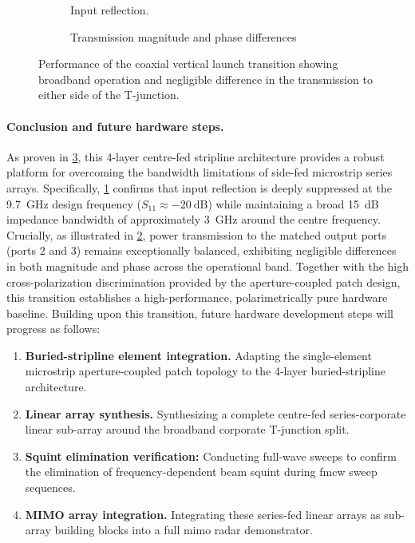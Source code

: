 \begin{figure}[!ht]
    \centering
    \begin{subfigure}{0.38\textwidth}
        \centering
        
        \caption{Input reflection.}
        \label{fig:vertical_coaxial_launcher_reflection}
    \end{subfigure}
    \hfill
    \begin{subfigure}{0.58\textwidth}
        \centering
        
        \caption{Transmission magnitude and phase differences}
        \label{fig:vertical_coaxial_launcher_transmission_differences}
    \end{subfigure}
    \caption{Performance of the coaxial vertical launch transition showing broadband operation and negligible difference in the transmission to either side of the T-junction.}
    \label{fig:vertical_coaxial_launcher_performance}
\end{figure}

\paragraph{Conclusion and future hardware steps.}
As proven in \cref{fig:vertical_coaxial_launcher_performance}, this 4-layer centre-fed stripline architecture provides a robust platform for overcoming the bandwidth limitations of side-fed microstrip series arrays.
Specifically, \cref{fig:vertical_coaxial_launcher_reflection} confirms that input reflection is deeply suppressed at the \qty{9.7}{\giga\hertz} design frequency ($S_{11} \approx \qty{-20}{\dB}$) while maintaining a broad \qty{15}{\dB} impedance bandwidth of approximately \qty{3}{\giga\hertz} around the centre frequency.
Crucially, as illustrated in \cref{fig:vertical_coaxial_launcher_transmission_differences}, power transmission to the matched output ports (ports 2 and 3) remains exceptionally balanced, exhibiting negligible differences in both magnitude and phase across the operational band.
Together with the high cross-polarization discrimination provided by the aperture-coupled patch design, this transition establishes a high-performance, polarimetrically pure hardware baseline.
Building upon this transition, future hardware development steps will progress as follows:
\begin{enumerate}
    \item \textbf{Buried-stripline element integration.} Adapting the single-element microstrip aperture-coupled patch topology to the 4-layer buried-stripline architecture.
    \item \textbf{Linear array synthesis.} Synthesizing a complete centre-fed series-corporate linear sub-array around the broadband corporate T-junction split.
    \item \textbf{Squint elimination verification:} Conducting full-wave sweeps to confirm the elimination of frequency-dependent beam squint during \gls{fmcw} sweep sequences.
    \item \textbf{MIMO array integration.} Integrating these series-fed linear arrays as sub-array building blocks into a full \gls{mimo} radar demonstrator.
\end{enumerate}

